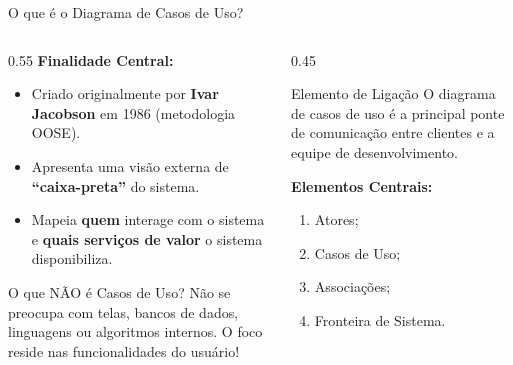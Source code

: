 \documentclass[10pt]{beamer}
\begin{document}
\begin{frame}{O que é o Diagrama de Casos de Uso?}
    \begin{columns}
        \begin{column}{0.55\textwidth}
            \textbf{Finalidade Central:}
            \begin{itemize}
                \item Criado originalmente por \textbf{Ivar Jacobson} em 1986 (metodologia OOSE).
                \item Apresenta uma visão externa de \textbf{``caixa-preta''} do sistema.
                \item Mapeia \textbf{quem} interage com o sistema e \textbf{quais serviços de valor} o sistema disponibiliza.
            \end{itemize}
            \vspace{0.2cm}
            \begin{block}{O que NÃO é Casos de Uso?}
                Não se preocupa com telas, bancos de dados, linguagens ou algoritmos internos. O foco reside nas funcionalidades do usuário!
            \end{block}
        \end{column}
        \begin{column}{0.45\textwidth}
            \begin{alertblock}{Elemento de Ligação}
                O diagrama de casos de uso é a principal ponte de comunicação entre clientes e a equipe de desenvolvimento.
            \end{alertblock}
            \vspace{0.2cm}
            \textbf{Elementos Centrais:}
            \begin{enumerate}
                \item Atores;
                \item Casos de Uso;
                \item Associações;
                \item Fronteira de Sistema.
            \end{enumerate}
        \end{column}
    \end{columns}
\end{frame}
\end{document}
